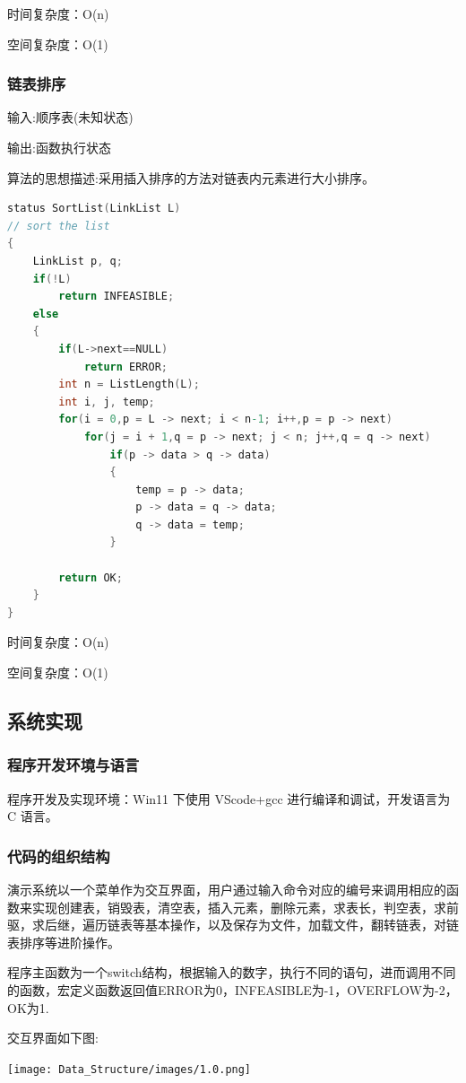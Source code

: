 \documentclass[supercite]{Experimental_Report}
\theoremstyle{definition}
\begin{document}
时间复杂度：O(n)

空间复杂度：O(1)

\subsubsection{链表排序}
输入:顺序表(未知状态)

输出:函数执行状态

算法的思想描述:采用插入排序的方法对链表内元素进行大小排序。	
\begin{lstlisting}[language=C] 
status SortList(LinkList L)
// sort the list
{
    LinkList p, q;
    if(!L) 
		return INFEASIBLE;
    else
	{
        if(L->next==NULL) 
			return ERROR;
        int n = ListLength(L);
        int i, j, temp;
        for(i = 0,p = L -> next; i < n-1; i++,p = p -> next)
            for(j = i + 1,q = p -> next; j < n; j++,q = q -> next)
                if(p -> data > q -> data)
				{
                    temp = p -> data;
                    p -> data = q -> data;
                    q -> data = temp;
                }

        return OK;
    }
}
\end{lstlisting}
时间复杂度：O(n)

空间复杂度：O(1)
\clearpage
\subsection{系统实现}

\subsubsection{程序开发环境与语言}
程序开发及实现环境：Win11 下使用 VScode+gcc 进行编译和调试，开发语言为 C 语言。
\subsubsection{代码的组织结构}
演示系统以一个菜单作为交互界面，用户通过输入命令对应的编号来调用相应的函数来实现创建表，销毁表，清空表，插入元素，删除元素，求表长，判空表，求前驱，求后继，遍历链表等基本操作，以及保存为文件，加载文件，翻转链表，对链表排序等进阶操作。


程序主函数为一个switch结构，根据输入的数字，执行不同的语句，进而调用不同的函数，宏定义函数返回值ERROR为0，INFEASIBLE为-1，OVERFLOW为-2，OK为1.


交互界面如下图:


\texttt{[image: Data\_Structure/images/1.0.png]}
\vspace{-0.2cm}
\end{document}
